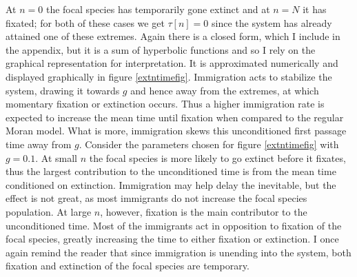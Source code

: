 At $n=0$ the focal species has temporarily gone extinct and at $n=N$ it has fixated; for both of these cases we get $\tau[n]=0$ since the system has already attained one of these extremes. %
Again there is a closed form, which I include in the appendix, but it is a sum of hyperbolic functions and so I rely on the graphical representation for interpretation. 
It is approximated numerically and displayed graphically in figure \ref{extntimefig}. 
Immigration acts to stabilize the system, drawing it towards $g$ and hence away from the extremes, at which momentary fixation or extinction occurs. 
Thus a higher immigration rate is expected to increase the mean time until fixation when compared to the regular Moran model. 
What is more, immigration skews this unconditioned first passage time away from $g$. 
Consider the parameters chosen for figure \ref{extntimefig} with $g=0.1$. At small $n$ the focal species is more likely to go extinct before it fixates, thus the largest contribution to the unconditioned time is from the mean time conditioned on extinction. Immigration may help delay the inevitable, but the effect is not great, as most immigrants do not increase the focal species population. 
At large $n$, however, fixation is the main contributor to the unconditioned time. Most of the immigrants act in opposition to fixation of the focal species, greatly increasing the time to either fixation or extinction. 
I once again remind the reader that since immigration is unending into the system, both fixation and extinction of the focal species are temporary. 
